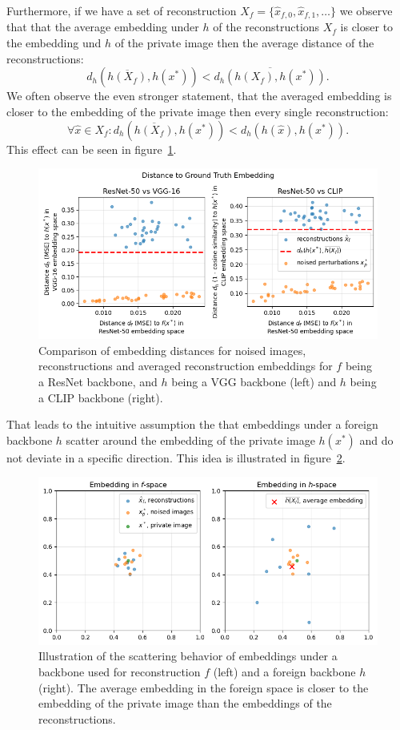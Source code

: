\documentclass[10pt,twocolumn]{article}
\begin{document}
Furthermore, if we have a set of reconstruction $X_f = \{\hat x_{f,0}, \hat x_{f,1}, \dots\}$ we observe that that the average embedding under $h$ of the reconstructions $X_f$ is closer to the embedding und $h$ of the private image then the average distance of the reconstructions: $$d_h\left(\overline{h(X_f)}, h(x^*)\right) < \overline{d_h(h(X_f), h(x^*))}.$$
We often observe the even stronger statement, that the averaged embedding is closer to the embedding of the private image then every single reconstruction: $$\forall\hat x \in X_f: d_h\left(\overline{h(X_f)}, h(x^*)\right) < d_h(h(\hat x), h(x^*)).$$
This effect can be seen in figure~\ref{fig:avg_distance_scatter}.
\begin{figure}[ht]
    \centering
    \includegraphics[width=\linewidth]{figures/avg-distance-scatter.png}
    \caption{
       Comparison of embedding distances for noised images, reconstructions and averaged reconstruction embeddings for $f$ being a ResNet backbone, and $h$ being a VGG backbone (left) and $h$ being a CLIP backbone (right).
    }
    \label{fig:avg_distance_scatter}
\end{figure}

That leads to the intuitive assumption the that embeddings under a foreign backbone $h$ scatter around the embedding of the private image $h(x^*)$ and do not deviate in a specific direction.
This idea is illustrated in figure~\ref{fig:avg_embedding_sketch}.
\begin{figure}[ht]
    \centering
    \includegraphics[width=\linewidth]{figures/avg-embedding-sketch.png}
    \caption{
       Illustration of the scattering behavior of embeddings under a backbone used for reconstruction $f$ (left) and a foreign backbone $h$ (right).
       The average embedding in the foreign space is closer to the embedding of the private image than the embeddings of the reconstructions.
    }
    \label{fig:avg_embedding_sketch}
\end{figure}
\end{document}
